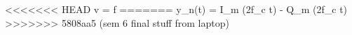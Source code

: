 <<<<<<< HEAD
v = f \cdot \lambda
=======
y_n(t) = I_m \cos(2\pi f_c t) - Q_m \sin(2\pi f_c t)
>>>>>>> 5808aa5 (sem 6 final stuff from laptop)
